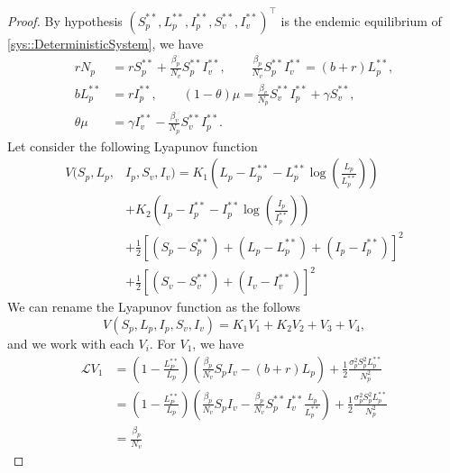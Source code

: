 \begin{proof}
	By hypothesis 
	$
		(S_p^{**}, L_p^{**}, I_p^{**}, S_v^{**}, I_v^{**}) ^ \top
	$ is the endemic equilibrium of \autoref{sys::DeterministicSystem}, we have
	\begin{equation}
		\begin{aligned}
			rN_p
				&=
					rS_p^{**} + 
					\frac{\beta_p}{N_v}S_p^{**}I_v^{**},
					\quad\quad 
					\frac{\beta_p}{N_v}S_p^{**}I_v^{**} = (b+r)L_p^{**},
			\\
			bL_p^{**}
				&=
					rI_p^{**}, 
					\quad\quad 
					(1-\theta)
					\mu = \frac{\beta_v}{N_p}S_v^{**}I_p^{**}+\gamma S_v^{**},
			\\
					\theta\mu &= 
					\gamma I_v^{**} -\frac{\beta_v}{N_p}S_v^{**}I_p^{**}.
		\end{aligned}
	\end{equation}
	Let consider the following Lyapunov function
	\begin{align*}
		V(S_p,L_p,&I_p,S_v,I_v) = 
				K_1
				\left(
					L_p - L_p^{**} - 
					L_p^{**}\log
					\left(
						\frac{L_p}{L_p^{**}}
					\right)
				\right) 
				\\
				&+ 
				 K_2
				\left(
				 	I_p - I_p^{**} - I_p^{**} 
				 	\log
					\left(
						\frac{I_p}{I_p^{**}}
				 	\right)
				\right)
			\\
				&+
				\frac{1}{2}
				\left[
					(S_p - S_p^{**}) + 
					(L_p - L_p^{**}) + 
					(I_p - I_p^{**})
				\right]^2 
				\\
				&+ 
				\frac{1}{2}
				\left[
					(S_v - S_v^{**}) + 
					(I_v - I_v^{**})
				\right]^2		
	\end{align*}
	We can rename the Lyapunov function as the follows
	\begin{equation}
		V(S_p,L_p,I_p,S_v,I_v)= K_1V_1+K_2V_2+V_3+V_4,
	\end{equation}
%
	and we work with each $V_i$. For $V_1$, we have
	\begin{align*}
		\mathcal{L} V_1 
			&= 
				\left(
					1 - 
					\frac{L_P^{**}}{L_p}
				\right)
				\left(
					\frac{\beta_p}{N_v}S_pI_v - 
					(b+r) L_p
				\right) + 
				\frac{1}{2}
				\frac{\sigma_p^2S_p^2L_p^{**}}{N_p^2}
			\\
			&=
				\left(
					1 - \frac{L_P^{**}}{L_p}
				\right)
				\left(
					\frac{\beta_p}{N_v} S_pI_v - 
					\frac{\beta_p}{N_v} S_p ^{**} I_v ^{**} 
					\frac{L_p}{L_p^{**}}
				\right) + 
				\frac{1}{2}
				\frac{\sigma_p^2S_p^2L_p^{**}}{N_p^2}
			\\
			&=
				\frac{\beta_p}{N_v}

\end{align*}
\end{proof}
